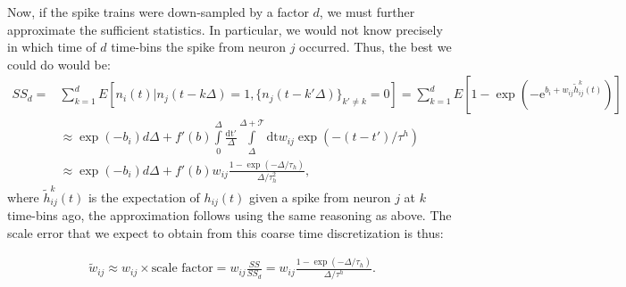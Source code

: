 \documentclass[aoas,preprint]{imsart}
\begin{document}
Now, if the spike trains were down-sampled by a factor $d$, we must further approximate the sufficient statistics. In particular, we would not know precisely in which time of $d$ time-bins the spike from neuron $j$ occurred.  Thus, the best we could do would be:
\begin{align} %
SS_d=&\sum_{k=1}^{d} E\left[n_i(t) | n_j(t-k\Delta)=1, \{n_j(t-k'\Delta)\}_{k' \neq k}=0\right] %
=\sum_{k=1}^d E\left[1-\exp\left(-\text{e}^{b_i+w_{ij}\tilde{h}_{ij}^k(t)}\right) \right] \nonumber \\
&\approx \exp(-b_i) d\Delta + f'(b) \int\limits_0^\Delta \frac{\text{dt}'}{\Delta} \int\limits_{\Delta}^{\Delta + \mathcal{T}} \text{dt} w_{ij}\exp(-(t-t')/\tau^h) \nonumber \\&
\approx \exp(-b_i) d\Delta +  f'(b)w_{ij}\frac{1-\exp(-\Delta/\tau_h)}{\Delta/\tau_h^2}, \label{eqn:SS_d}
\end{align}
\noindent where $\tilde{h}_{ij}^k(t)$ is the expectation of $h_{ij}(t)$ given a spike from neuron $j$ at $k$ time-bins ago, the approximation follows using the same reasoning as above. The scale error that we expect to obtain from this coarse time discretization is thus: 

\begin{align} \label{eqn:bias}
	\tilde w_{ij} \approx w_{ij} \times\text{scale factor} = w_{ij}  \frac{SS}{SS_d} = w_{ij} \frac{1-\exp(-\Delta/\tau_h)}{\Delta/\tau^h}.
\end{align}

\end{document}
